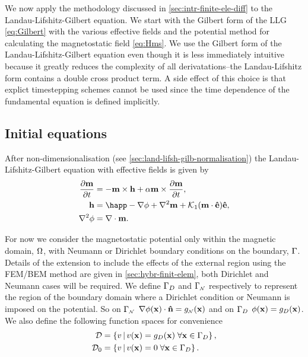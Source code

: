 We now apply the methodology discussed in \autoref{sec:intr-finite-ele-diff} to the Landau-Lifshitz-Gilbert equation.
We start with the Gilbert form of the LLG \eqref{eq:Gilbert} with the various effective fields and the potential method for calculating the magnetostatic field \eqref{eq:Hms}.
We use the Gilbert form of the Landau-Lifshitz-Gilbert equation even though it is less immediately intuitive because it greatly reduces the complexity of all derivatations--the Landau-Lifshitz form contains a double cross product term.
A side effect of this choice is that explict timestepping schemes cannot be used since the time dependence of the fundamental equation is defined implicitly.

\subsection{Initial equations}

After non-dimensionalisation (see \autoref{sec:land-lifsh-gilb-normalisation}) the Landau-Lifshitz-Gilbert equation with effective fields is given by
\begin{equation}
  \begin{aligned}
    \dmdt &= - \mv \times \hv + \alpha \mv \times \dmdt, \\
    \hv &= \happ - \nabla \phim + \lap \mv + \kone (\mv \cdot \ev) \ev, \\
    \lap \phim &= \div \mv.
    \label{eqn:ndllg-starting}
  \end{aligned}
\end{equation}

For now we consider the magnetostatic potential only within the magnetic domain, $\Omega$, with Neumann or Dirichlet boundary conditions on the boundary, ${\Gamma}$. 
Details of the extension to include the effects of the external region using the FEM/BEM method are given in \autoref{sec:hybr-finit-elem}, both Dirichlet and Neumann cases will be required.
We define ${\Gamma}_D$ and ${\Gamma}_{\scriptscriptstyle{\mathcal{N}}}$ respectively to represent the region of the boundary domain where a Dirichlet condition or Neumann is imposed on the potential.
So on ${\Gamma}_{\scriptscriptstyle{\mathcal{N}}}$ $\nabla \phi(\mathbf{x}) \cdot \mathbf{\hat{n}} = g_{\scriptscriptstyle{\mathcal{N}}}(\mathbf{x})$ and on ${\Gamma}_D$ $\phi(\mathbf{x}) = g_D(\mathbf{x})$.
We also define the following function spaces for convenience
\begin{align}
  \label{eq:037}
  \mathcal{D} & = \left\{ { v \,|\, v(\mathbf{x}) = g_D(\mathbf{x}) \; \forall \mathbf{x} \in {\Gamma}_D } \right\}, \\
  \mathcal{D}_0 &= \left\{ { v \,|\, v(\mathbf{x}) = 0 \; \forall \mathbf{x} \in {\Gamma}_D } \right\}.
\end{align}


